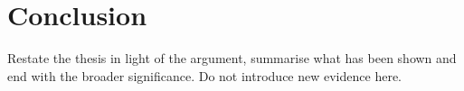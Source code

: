 \section{Conclusion}

Restate the thesis in light of the argument, summarise what has been shown and end with the broader
significance. Do not introduce new evidence here.
